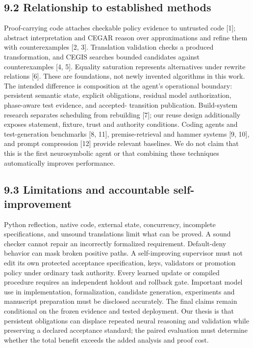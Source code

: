 \documentclass{article}
\begin{document}
\subsection*{9.2 Relationship to established methods}

Proof-carrying code attaches checkable policy evidence to untrusted code [1]; abstract interpretation
and CEGAR reason over approximations and refine them with counterexamples [2, 3]. Translation
validation checks a produced transformation, and CEGIS searches bounded candidates against
counterexamples [4, 5]. Equality saturation represents alternatives under rewrite relations [6]. These
are foundations, not newly invented algorithms in this work.
The intended difference is composition at the agent’s operational boundary: persistent semantic
state, explicit obligations, residual model authorization, phase-aware test evidence, and accepted-
transition publication. Build-system research separates scheduling from rebuilding [7]; our reuse
design additionally exposes statement, fixture, trust and authority conditions. Coding agents and
test-generation benchmarks [8, 11], premise-retrieval and hammer systems [9, 10], and prompt
compression [12] provide relevant baselines. We do not claim that this is the first neurosymbolic
agent or that combining these techniques automatically improves performance.

\subsection*{9.3 Limitations and accountable self-improvement}

Python reflection, native code, external state, concurrency, incomplete specifications, and unsound
translations limit what can be proved. A sound checker cannot repair an incorrectly formalized
requirement. Default-deny behavior can mask broken positive paths. A self-improving supervisor
must not edit its own protected acceptance specification, keys, validators or promotion policy under
ordinary task authority. Every learned update or compiled procedure requires an independent holdout
and rollback gate.
Important model use in implementation, formalization, candidate generation, experiments and
manuscript preparation must be disclosed accurately. The final claims remain conditional on the
frozen evidence and tested deployment. Our thesis is that persistent obligations can displace repeated
neural reasoning and validation while preserving a declared acceptance standard; the paired evaluation
must determine whether the total benefit exceeds the added analysis and proof cost.
\end{document}
